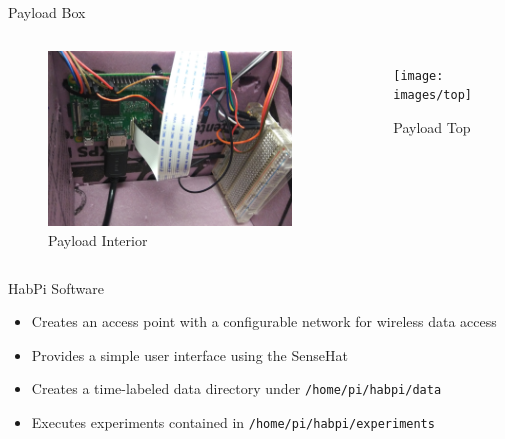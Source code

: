 \documentclass[handout]{beamer}
\begin{document}
\begin{frame}{Payload Box}
    \begin{columns}[t]
        \begin{figure}
            \includegraphics[height=0.6\textheight]{images/interior}
            \caption{\tiny Payload Interior}
        \end{figure}
        \begin{figure}
            \centering
            \texttt{[image: images/top]}
            \caption{\tiny Payload Top}
        \end{figure}
    \end{columns}
\end{frame}

\begin{frame}{HabPi Software}
	\begin{itemize}
	\item Creates an access point with a configurable network for wireless data access
	\item Provides a simple user interface using the SenseHat
	\item Creates a time-labeled data directory under {\tt /home/pi/habpi/data}
	\item Executes experiments contained in {\tt /home/pi/habpi/experiments}
	\end{itemize}
\end{frame}
\end{document}

